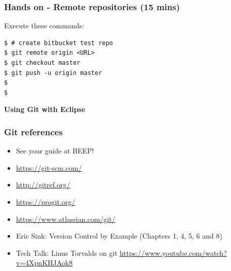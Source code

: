 \documentclass{beamer}
\begin{document}
\begin{frame}[fragile]
\frametitle{Hands on - Remote repositories (15 mins)}

Execute these commands:

\begin{lstlisting}
$ # create bitbucket test repo
$ git remote origin <URL>
$ git checkout master
$ git push -u origin master
$ 
$
\end{lstlisting}
\end{frame}


\begin{frame}
\LARGE	
\textbf{Using Git with Eclipse}
\end{frame}



\begin{frame}
\frametitle{Git references}

\begin{itemize}
\item See your guide at BEEP!
\item \url{https://git-scm.com/}
\item \url{http://gitref.org/}
\item \url{https://progit.org/}
\item \url{https://www.atlassian.com/git/}
\item Eric Sink: Version Control by Example (Chapters 1, 4, 5, 6 and
  8)
\item Tech Talk: Linus Torvalds on git
\url{https://www.youtube.com/watch?v=4XpnKHJAok8}

\end{itemize}

\end{frame}
\end{document}
